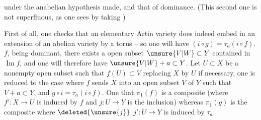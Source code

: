 under the anabelian hypothesis made, and that of dominance. (This second one is not superfluous, as one sees by taking  )

First of all, one checks that an elementary Artin variety does indeed embed  in an extension of an abelian variety by a torus -- so one will have $(i\circ g)=\tau_a(i\circ f)$.    $f$, being dominant, there exists a  open subset $\unsure{V|W}\subset Y$ contained in $\operatorname{Im}f$, and one will therefore have $\unsure{V|W}+a\subset Y$. Let $U\subset X$ be a nonempty open subset such that $f(U)\subset V$   replacing $X$ by $U$ if necessary, one is reduced to the case where $f$ sends $X$ into an open subset $V$ of $Y$ such that $V+a\subset Y$, and $g\circ i=\tau_a(i\circ f)$. One   that $\pi_1(f)$ is a composite (where $f':X\longrightarrow U$ is  induced by $f$ and $j:U\longrightarrow Y$ is the inclusion)
whereas $\pi_1(g)$ is the composite
where $\deleted{\unsure{j}}$ $j':U\longrightarrow Y$ is induced by $\tau_a$.
